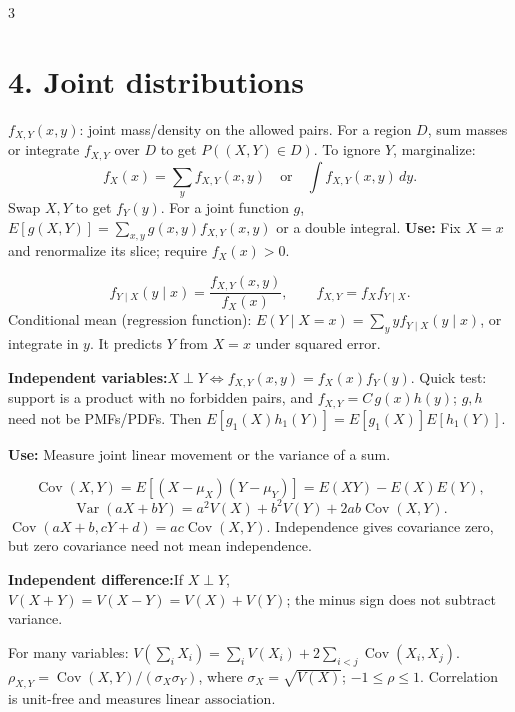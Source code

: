 \documentclass[10pt,a4paper,landscape]{article}
\newcommand{\CheatNote}[2]{\par\noindent\textcolor{cueorange}{\textbf{#1:}}\;#2\par}
\newcommand{\Use}[1]{\textcolor{cueorange}{\textbf{Use:}} #1\par}
\begin{document}
\begin{multicols}{3}
\section*{4. Joint distributions}
\(f_{X,Y}(x,y)\): joint mass/density on the allowed pairs. For a region \(D\), sum masses or integrate \(f_{X,Y}\) over \(D\) to get \(P((X,Y)\in D)\). To ignore \(Y\), marginalize:
\[f_X(x)=\sum_y f_{X,Y}(x,y)\quad\text{or}\quad\int f_{X,Y}(x,y)\,dy.\]
Swap \(X,Y\) to get \(f_Y(y)\). For a joint function \(g\), \(E[g(X,Y)]=\sum_{x,y}g(x,y)f_{X,Y}(x,y)\) or a double integral.
\Use{Fix \(X=x\) and renormalize its slice; require \(f_X(x)>0\).}
\[f_{Y\mid X}(y\mid x)=\frac{f_{X,Y}(x,y)}{f_X(x)},\qquad f_{X,Y}=f_X f_{Y\mid X}.\]
Conditional mean (regression function): \(E(Y\mid X=x)=\sum_y y f_{Y\mid X}(y\mid x)\), or integrate in \(y\). It predicts \(Y\) from \(X=x\) under squared error.
\CheatNote{Independent variables}{\(X\perp Y\iff f_{X,Y}(x,y)=f_X(x)f_Y(y)\). Quick test: support is a product with no forbidden pairs, and \(f_{X,Y}=C\,g(x)h(y)\); \(g,h\) need not be PMFs/PDFs. Then \(E[g_1(X)h_1(Y)]=E[g_1(X)]E[h_1(Y)]\).}
\Use{Measure joint linear movement or the variance of a sum.}
\[\operatorname{Cov}(X,Y)=E[(X-\mu_X)(Y-\mu_Y)]=E(XY)-E(X)E(Y),\]
\[\operatorname{Var}(aX+bY)=a^2V(X)+b^2V(Y)+2ab\operatorname{Cov}(X,Y).\]
\(\operatorname{Cov}(aX+b,cY+d)=ac\operatorname{Cov}(X,Y)\). Independence gives covariance zero, but zero covariance need not mean independence.\CheatNote{Independent difference}{If \(X\perp Y\), \(V(X+Y)=V(X-Y)=V(X)+V(Y)\); the minus sign does not subtract variance.}
For many variables: \(V(\sum_iX_i)=\sum_iV(X_i)+2\sum_{i<j}\operatorname{Cov}(X_i,X_j)\).
\(\rho_{X,Y}=\operatorname{Cov}(X,Y)/(\sigma_X\sigma_Y)\), where \(\sigma_X=\sqrt{V(X)}\); \(-1\le\rho\le1\). Correlation is unit-free and measures linear association.


\end{multicols}
\end{document}
